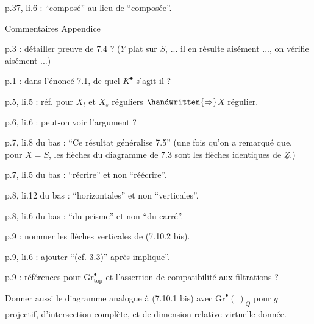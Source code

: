 
p.37, li.6 : ``composé'' au lieu de ``composée''.

\begin{center}
Commentaires Appendice
\end{center}

p.3 : détailler preuve de 7.4 ? ($Y$ plat sur $S$, ... il en résulte aisément ..., on vérifie aisément ...)

p.1 : dans l'énoncé 7.1, de quel $K^{\bullet}$ s'agit-il ?

p.5, li.5 : réf. pour $X_t$ et $X_s$ réguliers $\handwritten{\Rightarrow}$$X$ régulier.

p.6, li.6 : peut-on voir l'argument ?

p.7, li.8 du bas : ``Ce résultat généralise 7.5'' (une fois qu'on a remarqué que, pour $X = S$, les flèches du diagramme de 7.3 sont les flèches identiques de $\underline{Z}$.)

p.7, li.5 du bas : ``récrire'' et non ``réécrire''.

p.8, li.12 du bas : ``horizontales'' et non ``verticales''.

p.8, li.6 du bas : ``du prisme'' et non ``du carré''.

p.9 : nommer les flèches verticales de (7.10.2 bis).

p.9, li.6 : ajouter ``(cf. 3.3)'' après implique''.

p.9 : références pour $\mathrm{Gr}^{\bullet}_{\mathrm{top}}$ et l'assertion de compatibilité aux filtrations ?

Donner aussi le diagramme analogue à (7.10.1 bis) avec $\mathrm{Gr}^{\bullet}(\ )_{\underline{Q}}$ pour $g$ projectif, d'intersection complète, et de dimension relative virtuelle donnée.


